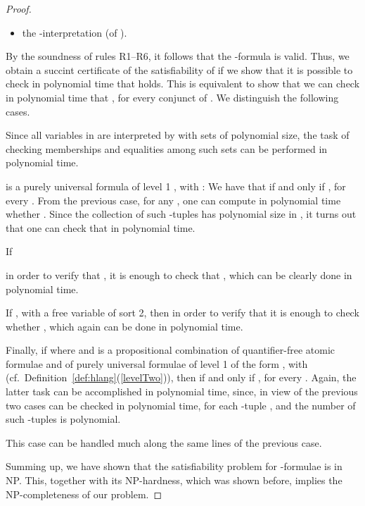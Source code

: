 \documentclass{fundam}
\begin{document}
\begin{proof}
\begin{itemize}
    \item the -interpretation  (of
    ).
\end{itemize}
By the soundness of rules R1--R6, it follows that the -formula
 is valid.  Thus, we obtain a succint
certificate of the satisfiability of  if we show that it is
possible to check in polynomial time that 
holds.  This is equivalent to show that we can check in polynomial
time that , for every conjunct  of .
We distinguish the following cases.
\begin{description}
\item [ is a quantifier-free atomic formula:] Since all variables
in  are interpreted by  with sets of polynomial size,
the task of checking memberships and equalities among such sets can be
performed in polynomial time.

\begin{sloppypar}
\item [ is a purely universal formula of level 1 , with :] We have that
 if and
only if , for
every .  From the previous case, for any
, one can compute in polynomial time whether
.  Since the
collection of such -tuples  has polynomial
size in , it turns out that one can check that  in polynomial time.
\end{sloppypar}


\item [ is a purely universal formula of level 2:]  If

in order to verify that , it is enough to check
that , which can be
clearly done in polynomial time.

If , with  a free variable of sort 2, then in
order to verify that  it is enough to check
whether , which again can
be done in polynomial time.

Finally, if  where  and  is a propositional
combination of quantifier-free atomic formulae and of purely universal formulae of level 1 of the form , with  (cf.\
Definition~\ref{def:hlang}(\ref{levelTwo})), then  if and only if , for every .  Again,
the latter task can be accomplished in polynomial time, since, in view
of the previous two cases  can be checked in polynomial time, for each
-tuple , and the number of
such -tuples is polynomial.



\item [ is a purely universal formula of level 3:]
This case can be handled much along the same lines of the previous
case.
\end{description}
Summing up, we have shown that the satisfiability problem for
-formulae is in \textsf{NP}.  This, together with its
\textsf{NP}-hardness, which was shown before, implies the
\textsf{NP}-completeness of our problem.
\end{proof}
\end{document}
